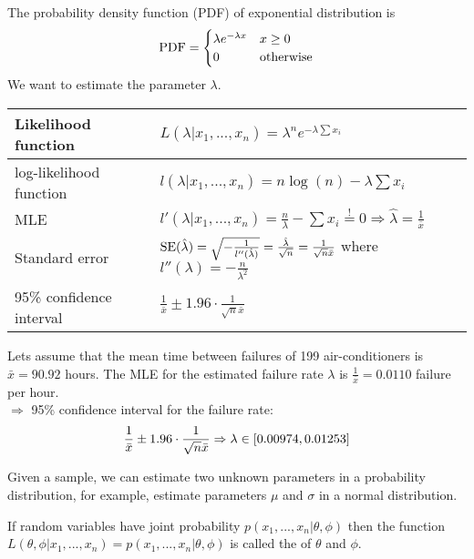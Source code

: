 \begin{example}
    The probability density function (PDF) of exponential distribution is
    \begin{align}
        \operatorname{PDF} = \begin{cases}
            \lambda e^{-\lambda x} & x\ge 0 \\ 0 & \text{otherwise}
        \end{cases}\notag
    \end{align}
    We want to estimate the parameter $\lambda$. 
    \begin{center}
       \begin{tabular}{p{4cm}|p{7cm}}
            Likelihood function & $L(\lambda\vert x_1,...,x_n) = \lambda^n e^{-\lambda\sum x_i}$ \\
            \hline
            log-likelihood function & $l(\lambda\vert x_1,...,x_n) = n\log(n)-\lambda\sum x_i$ \\
            \hline
            MLE & $l'(\lambda\vert x_1,...,x_n) = \frac{n}{\lambda} - \sum x_i \overset{!}{=} 0\Rightarrow \hat{\lambda} = \frac{1}{\bar{x}}$ \\
            \hline
            Standard error & $\operatorname{SE}(\hat{\lambda}) = \sqrt{-\frac{1}{l''(\hat{\lambda})}} = \frac{\hat{\lambda}}{\sqrt{n}} = \frac{1}{\sqrt{n}\bar{x}}$ where $l''(\lambda) = -\frac{n}{\lambda^2}$ \\
            \hline
            95\% confidence interval & $\frac{1}{\bar{x}}\pm 1.96\cdot\frac{1}{\sqrt{n}\bar{x}}$
       \end{tabular}
    \end{center}
    
    Lets assume that the mean time between failures of 199 air-conditioners is $\bar{x} = 90.92$ hours. The MLE for the estimated failure rate $\lambda$ is $\frac{1}{\bar{x}} = 0.0110$ failure per hour. \\
    $\Rightarrow$ 95\% confidence interval for the failure rate:
    \begin{align}
        \frac{1}{\bar{x}} \pm 1.96\cdot\frac{1}{\sqrt{n}\bar{x}} \Rightarrow \lambda\in [0.00974,0.01253]\notag
    \end{align}
\end{example}    
    
Given a sample, we can estimate two unknown parameters in a probability distribution, for example, estimate parameters $\mu$ and $\sigma$ in a normal distribution.
    
\begin{definition}
    If random variables have joint probability $p(x_1,...,x_n\vert \theta,\phi)$ then the function $L(\theta,\phi\vert x_1,...,x_n)=p(x_1,...,x_n\vert\theta,\phi)$ is called the  of $\theta$ and $\phi$.
\end{definition}


